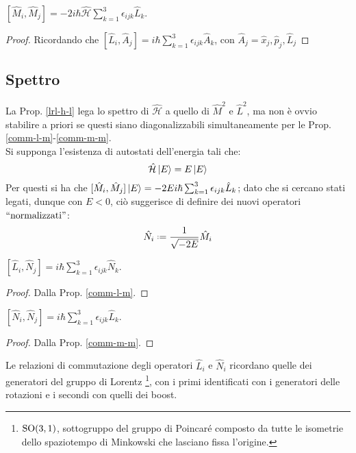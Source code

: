 \begin{proposition}\label{comm-m-m}
	$ [\hat{M}_i, \hat{M}_j] = -2i\hbar \hat{\mathcal{H}} \sum_{k = 1}^{3} \epsilon_{ijk} \hat{L}_k $.
\end{proposition}
\begin{proof}
	Ricordando che $ [\hat{L}_i, \hat{A}_j] = i\hbar \sum_{k = 1}^{3} \epsilon_{ijk} \hat{A}_k $, con $ \hat{A}_j = \hat{x}_j, \hat{p}_j, \hat{L}_j $
\end{proof}

\subsection{Spettro}

La Prop. \ref{lrl-h-l} lega lo spettro di $ \hat{\mathcal{H}} $ a quello di $ \hat{M}^2 $ e $ \hat{L}^2 $, ma non è ovvio stabilire a priori se questi siano diagonalizzabili simultaneamente per le Prop. \ref{comm-l-m}-\ref{comm-m-m}.\\
Si supponga l'esistenza di autostati dell'energia tali che:
\begin{equation}
	\hat{\mathcal{H}} \ket{E} = E \ket{E}
	\label{eq:3.55}
\end{equation}
Per questi si ha che $ [\hat{M}_i, \hat{M}_j] \ket{E} = -2E i\hbar \sum_{k = 1}^{3} \epsilon_{ijk} \hat{L}_k $; dato che si cercano stati legati, dunque con $ E < 0 $, ciò suggerisce di definire dei nuovi operatori $ ``\text{normalizzati}" $:
\begin{equation}
	\hat{N}_i \defeq \frac{1}{\sqrt{-2E}} \hat{M}_i
	\label{eq:3.56}
\end{equation}

\begin{proposition}
	$ [\hat{L}_i, \hat{N}_j] = i\hbar \sum_{k = 1}^{3} \epsilon_{ijk} \hat{N}_k $.
\end{proposition}
\begin{proof}
	Dalla Prop. \ref{comm-l-m}.
\end{proof}

\begin{proposition}
	$ [\hat{N}_i, \hat{N}_j] = i\hbar \sum_{k = 1}^{3} \epsilon_{ijk} \hat{L}_k $.
\end{proposition}
\begin{proof}
	Dalla Prop. \ref{comm-m-m}.
\end{proof}

Le relazioni di commutazione degli operatori $ \hat{L}_i $ e $ \hat{N}_i $ ricordano quelle dei generatori del gruppo di Lorentz \footnote{$ \mathrm{SO}(3,1) $, sottogruppo del gruppo di Poincaré composto da tutte le isometrie dello spaziotempo di Minkowski che lasciano fissa l'origine.}, con i primi identificati con i generatori delle rotazioni e i secondi con quelli dei boost.

